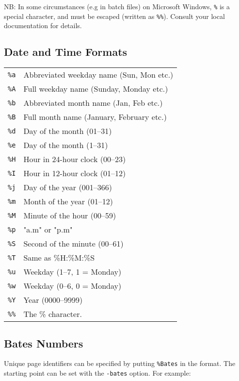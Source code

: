\documentclass{book}
\begin{document}
  NB: In some circumstances (e.g in batch files) on Microsoft Windows, \verb!%! is a special character, and must be escaped (written as \verb$%%$). Consult your local documentation for details.

  \subsection{Date and Time Formats}
  \begin{tabular}{ll}
    \texttt{\%a} & Abbreviated weekday name (Sun, Mon etc.)\\
    \texttt{\%A} & Full weekday name (Sunday, Monday etc.)\\
    \texttt{\%b} & Abbreviated month name (Jan, Feb etc.)\\
    \texttt{\%B} & Full month name (January, February etc.)\\
    \texttt{\%d} & Day of the month (01--31) \\
    \texttt{\%e} & Day of the month (1--31) \\
    \texttt{\%H} & Hour in 24-hour clock (00--23)\\
    \texttt{\%I} & Hour in 12-hour clock (01--12)\\
    \texttt{\%j} & Day of the year (001--366)\\
    \texttt{\%m} & Month of the year (01--12)\\
    \texttt{\%M} & Minute of the hour (00--59)\\
    \texttt{\%p} & "a.m" or "p.m"\\
    \texttt{\%S} & Second of the minute (00--61)\\
    \texttt{\%T} & Same as \%H:\%M:\%S\\
    \texttt{\%u} & Weekday (1--7, 1 = Monday)\\
    \texttt{\%w} & Weekday (0--6, 0 = Monday)\\
    \texttt{\%Y} & Year (0000--9999)\\
    \texttt{\%\%} & The \% character.
  \end{tabular}


  \subsection{Bates Numbers}
  Unique page identifiers can be specified by putting \verb!%Bates! in the format.
The starting point can be set with the \texttt{-bates} option. For example:

\noindent{}
\end{document}
